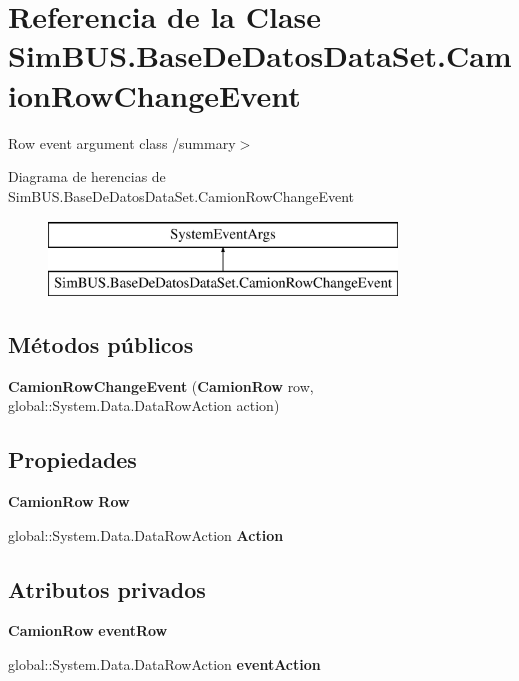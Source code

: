 \section{Referencia de la Clase Sim\-B\-U\-S.\-Base\-De\-Datos\-Data\-Set.\-Camion\-Row\-Change\-Event}
\label{class_sim_b_u_s_1_1_base_de_datos_data_set_1_1_camion_row_change_event}


Row event argument class /summary$>$  


Diagrama de herencias de Sim\-B\-U\-S.\-Base\-De\-Datos\-Data\-Set.\-Camion\-Row\-Change\-Event\begin{figure}[H]
\begin{center}
\leavevmode
\includegraphics[height=2.000000cm]{class_sim_b_u_s_1_1_base_de_datos_data_set_1_1_camion_row_change_event}
\end{center}
\end{figure}
\subsection*{Métodos públicos}
\begin{DoxyCompactItemize}
\item 
{\bf Camion\-Row\-Change\-Event} ({\bf Camion\-Row} row, global\-::\-System.\-Data.\-Data\-Row\-Action action)
\end{DoxyCompactItemize}
\subsection*{Propiedades}
\begin{DoxyCompactItemize}
\item 
{\bf Camion\-Row} {\bf Row}\hspace{0.3cm}{\ttfamily  [get]}
\item 
global\-::\-System.\-Data.\-Data\-Row\-Action {\bf Action}\hspace{0.3cm}{\ttfamily  [get]}
\end{DoxyCompactItemize}
\subsection*{Atributos privados}
\begin{DoxyCompactItemize}
\item 
{\bf Camion\-Row} {\bf event\-Row}
\item 
global\-::\-System.\-Data.\-Data\-Row\-Action {\bf event\-Action}
\end{DoxyCompactItemize}


